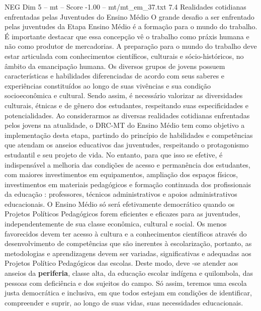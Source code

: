 \begin{textsample}{NEG Dim 5 – mt – Score -1.00 – mt/mt\_em\_37.txt}  \label{ex:f5_neg_203}
7.4 Realidades cotidianas enfrentadas pelas Juventudes do Ensino Médio O grande desafio a ser enfrentado pelas juventudes da Etapa Ensino Médio é a formação para o mundo do trabalho.
É importante destacar que essa concepção vê o trabalho como práxis humana e não como produtor de mercadorias.
A preparação para o mundo do trabalho deve estar articulada com conhecimentos científicos, culturais e sócio-históricos, no âmbito da emancipação humana.
Os diversos grupos de jovens possuem características e habilidades diferenciadas de acordo com seus saberes e experiências constituídos ao longo de suas vivências e sua condição socioeconômica e cultural.
Sendo assim, é necessário valorizar as diversidades culturais, étnicas e de gênero dos estudantes, respeitando suas especificidades e potencialidades.
Ao considerarmos as diversas realidades cotidianas enfrentadas pelos jovens na atualidade, o DRC-MT do Ensino Médio tem como objetivo a implementação desta etapa, partindo do princípio de habilidades e competências que atendam os anseios educativos das juventudes, respeitando o protagonismo estudantil e seu projeto de vida.
No entanto, para que isso se efetive, é indispensável a melhoria das condições de acesso e permanência dos estudantes, com maiores investimentos em equipamentos, ampliação dos espaços físicos, investimentos em materiais pedagógicos e formação continuada dos profissionais da educação : professores, técnicos administrativos e apoios administrativos educacionais.
O Ensino Médio só será efetivamente democrático quando os Projetos Políticos Pedagógicos forem eficientes e eficazes para as juventudes, independentemente de sua classe econômica, cultural e social.
Os menos favorecidos devem ter acesso à cultura e a conhecimentos científicos através do desenvolvimento de competências que são inerentes à escolarização, portanto, as metodologias e aprendizagens devem ser variadas, significativas e adequadas aos Projetos Político Pedagógicos das escolas.
Deste modo, deve -se atender aos anseios da \textbf{periferia}, classe alta, da educação escolar indígena e quilombola, das pessoas com deficiência e dos sujeitos do campo.
Só assim, teremos uma escola justa democrática e inclusiva, em que todos estejam em condições de identificar, compreender e suprir, ao longo de suas vidas, suas necessidades educacionais.

\end{textsample}
